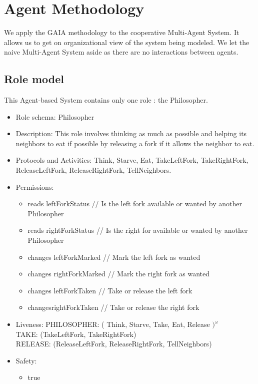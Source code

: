 \section{Agent Methodology}
We apply the GAIA methodology to the cooperative Multi-Agent System. It allows us to get on organizational view of the system being modeled. We let the naive Multi-Agent System aside as there are no interactions between agents.

\subsection{Role model}
This Agent-based System contains only one role : the Philosopher.
\begin{itemize}
\item{Role schema: }Philosopher
\item{Description: }This role involves thinking as much as possible and helping its neighbors to eat if possible by releasing a fork if it allows the neighbor to eat.
\item{Protocols and Activities: }Think, Starve, Eat, TakeLeftFork, TakeRightFork, ReleaseLeftFork, ReleaseRightFork, TellNeighbors.
\item{Permissions: }
    \begin{itemize}
    \item reads leftForkStatus // Is the left fork available or wanted by another Philosopher
    \item reads rightForkStatus // Is the right for available or wanted by another Philosopher
    \end{itemize}
    \begin{itemize}
    \item changes leftForkMarked // Mark the left fork as wanted
    \item changes rightForkMarked // Mark the right fork as wanted
    \item changes leftForkTaken // Take or release the left fork
    \item  changesrightForkTaken // Take or release the right fork
    \end{itemize}

\item{Liveness: }
                PHILOSOPHER: ( Think, Starve, Take, Eat, Release $)^\omega$\\
                TAKE: (TakeLeftFork, TakeRightFork)\\
                RELEASE: (ReleaseLeftFork, ReleaseRightFork, TellNeighbors)\\
\item{Safety: }
    \begin{itemize}
        \item true
    \end{itemize}
\end{itemize}

